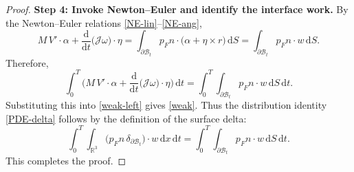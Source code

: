 \documentclass[10pt,a4paper]{amsart}
\begin{document}
\begin{proof}
\noindent\textbf{Step 4: Invoke Newton--Euler and identify the interface work.}
By the Newton--Euler relations \eqref{NE-lin}--\eqref{NE-ang},
\[
M\,{V'}\cdot \alpha
+\frac{\mathrm{d}}{\mathrm{d}t}\big(\mathcal J\omega\big)\cdot\eta
=\int_{\partial\mathcal{B}_t}p_Fn\cdot
\big(\alpha+\eta\times r\big)\,\mathrm{d}S=\int_{\partial\mathcal{B}_t} p_Fn\cdot w\,\mathrm{d}S.
\]
Therefore,
\[
\int_0^T \Big(M\,{V'}\cdot \alpha
+\frac{\mathrm{d}}{\mathrm{d}t}\big(\mathcal J\omega\big)\cdot\eta\Big)\,\mathrm{d}t
=\int_0^T\!\!\int_{\partial\mathcal{B}_t} p_Fn\cdot w\,\mathrm{d}S\,\mathrm{d}t.
\]
Substituting this into \eqref{weak-left} gives \eqref{weak}. Thus the distribution
identity \eqref{PDE-delta} follows by the definition of the surface delta:
\[
\int_0^T\!\!\int_{\mathbb R^3}\big(p_Fn\,\delta_{\partial\mathcal{B}_t}\big)\cdot w\,\mathrm{d}x\,\mathrm{d}t
=\int_0^T\!\!\int_{\partial\mathcal{B}_t} p_Fn\cdot w\,\mathrm{d}S\,\mathrm{d}t.
\]
This completes the proof.
\end{proof}
\end{document}
